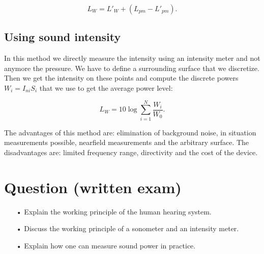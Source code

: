 	\begin{equation}
	L_W = L'_W + (L_{pm} - L'_{pm}).
	\end{equation}
	
\subsection{Using sound intensity}
	In this method we directly measure the intensity using an intensity meter and not anymore the pressure. We have to define a surrounding surface that we discretize. Then we get the intensity on these points and compute the discrete powers $W_i = I_{ni}S_i$ that we use to get the average power level:
	
	\begin{equation}
	L_{W} = 10 \log \sum _{i=1}^N \frac{W_i}{W_0}.
	\end{equation}
	
	The advantages of this method are: elimination of background noise, in situation measurements possible, nearfield measurements and the arbitrary surface. The disadvantages are: limited frequency range, directivity and the cost of the device. 
	
\section{Question (written exam)}
	\begin{itemize}
	\item[•] Explain the working principle of the human hearing system.
 	\item[•] Discuss the working principle of a sonometer and an intensity meter.
	\item[•] Explain how one can measure sound power in practice.
	\end{itemize}